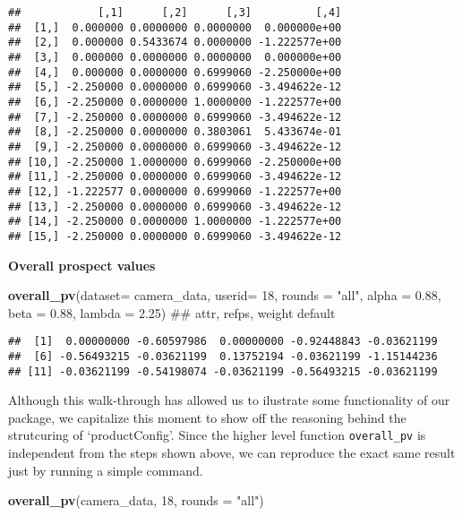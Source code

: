 \documentclass[]{article}
\newenvironment{Shaded}{\begin{snugshade}}{\end{snugshade}}
\newcommand{\KeywordTok}[1]{\textcolor[rgb]{0.13,0.29,0.53}{\textbf{{#1}}}}
\newcommand{\DataTypeTok}[1]{\textcolor[rgb]{0.13,0.29,0.53}{{#1}}}
\newcommand{\DecValTok}[1]{\textcolor[rgb]{0.00,0.00,0.81}{{#1}}}
\newcommand{\FloatTok}[1]{\textcolor[rgb]{0.00,0.00,0.81}{{#1}}}
\newcommand{\StringTok}[1]{\textcolor[rgb]{0.31,0.60,0.02}{{#1}}}
\newcommand{\NormalTok}[1]{{#1}}
\begin{document}
\begin{verbatim}
##            [,1]      [,2]      [,3]          [,4]
##  [1,]  0.000000 0.0000000 0.0000000  0.000000e+00
##  [2,]  0.000000 0.5433674 0.0000000 -1.222577e+00
##  [3,]  0.000000 0.0000000 0.0000000  0.000000e+00
##  [4,]  0.000000 0.0000000 0.6999060 -2.250000e+00
##  [5,] -2.250000 0.0000000 0.6999060 -3.494622e-12
##  [6,] -2.250000 0.0000000 1.0000000 -1.222577e+00
##  [7,] -2.250000 0.0000000 0.6999060 -3.494622e-12
##  [8,] -2.250000 0.0000000 0.3803061  5.433674e-01
##  [9,] -2.250000 0.0000000 0.6999060 -3.494622e-12
## [10,] -2.250000 1.0000000 0.6999060 -2.250000e+00
## [11,] -2.250000 0.0000000 0.6999060 -3.494622e-12
## [12,] -1.222577 0.0000000 0.6999060 -1.222577e+00
## [13,] -2.250000 0.0000000 0.6999060 -3.494622e-12
## [14,] -2.250000 0.0000000 1.0000000 -1.222577e+00
## [15,] -2.250000 0.0000000 0.6999060 -3.494622e-12
\end{verbatim}

\textbf{Overall prospect values}

\begin{Shaded}
\begin{Highlighting}[]
\KeywordTok{overall_pv}\NormalTok{(}\DataTypeTok{dataset=} \NormalTok{camera_data, }\DataTypeTok{userid=} \DecValTok{18}\NormalTok{,}
                \DataTypeTok{rounds =} \StringTok{"all"}\NormalTok{,}
                \DataTypeTok{alpha =} \FloatTok{0.88}\NormalTok{, }\DataTypeTok{beta =} \FloatTok{0.88}\NormalTok{, }\DataTypeTok{lambda =} \FloatTok{2.25}\NormalTok{)  ## attr, refps, weight default}
\end{Highlighting}
\end{Shaded}

\begin{verbatim}
##  [1]  0.00000000 -0.60597986  0.00000000 -0.92448843 -0.03621199
##  [6] -0.56493215 -0.03621199  0.13752194 -0.03621199 -1.15144236
## [11] -0.03621199 -0.54198074 -0.03621199 -0.56493215 -0.03621199
\end{verbatim}

Although this walk-through has allowed us to ilustrate some
functionality of our package, we capitalize this moment to show off the
reasoning behind the strutcuring of `productConfig'. Since the higher
level function \texttt{overall\_pv} is independent from the steps shown
above, we can reproduce the exact same result just by running a simple
command.

\begin{Shaded}
\begin{Highlighting}[]
\KeywordTok{overall_pv}\NormalTok{(camera_data, }\DecValTok{18}\NormalTok{, }\DataTypeTok{rounds =} \StringTok{"all"}\NormalTok{) }
\end{Highlighting}
\end{Shaded}
\end{document}
